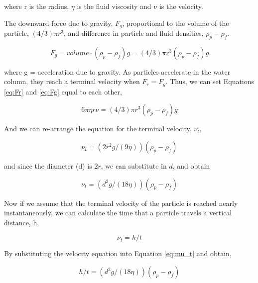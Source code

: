 \documentclass{tufte-handout}
\begin{document}
\noindent where r is the radius, 
$\eta$ is the fluid viscosity and 
$\nu$ is the velocity.

The downward force due to gravity, $F_g$, proportional to the volume of the particle, $(4/3)\pi r^3$, and difference in particle and fluid densities, $\rho_p - \rho_f$.

\begin{equation}\label{eq:Fg}
F_g = volume \cdot (\rho_p - \rho_f)g = (4/3)\pi r^3(\rho_p - \rho_f)g 
\end{equation}

\noindent where g = acceleration due to gravity. 
As particles accelerate in the water column, they reach a terminal velocity when $F_r = F_g$. Thus, we can set Equations \ref{eq:Fr} and \ref{eq:Fg} equal to each other,

\begin{equation}
6\pi \eta r \nu = (4/3)\pi r^3(\rho_p - \rho_f)g
\end{equation}

\noindent And we can re-arrange the equation for the terminal velocity, $\nu_t$,

\begin{equation}
\nu_t = (2r^2g/(9\eta))(\rho_p - \rho_f)
\end{equation}

\noindent and since the diameter (d) is $2r$, we can substitute in $d$, and obtain 

\begin{equation}\label{eq:mu_t}
\nu_t = (d^2g/(18\eta))(\rho_p - \rho_f)
\end{equation}

\noindent Now if we assume that the terminal velocity of the particle is reached nearly instantaneously, we can calculate the time that a particle travels a vertical distance, h, 

\begin{equation}
\nu_t = h/t
\end{equation}
 
\noindent By substituting the velocity equation into Equation \ref{eq:mu_t} and obtain,

\begin{equation}
h/t = (d^2g/(18\eta))(\rho_p - \rho_f)
\end{equation}
\end{document}
